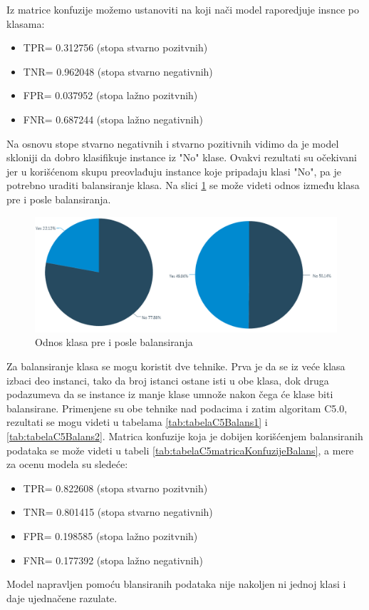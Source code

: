 \documentclass[a4paper]{article}
\begin{document}
Iz matrice konfuzije možemo ustanoviti na koji nači model raporedjuje insnce po klasama:
\begin{itemize}
    \item TPR= 0.312756 (stopa stvarno pozitvnih)
    \item TNR= 0.962048 (stopa stvarno negativnih)
    \item FPR= 0.037952 (stopa lažno pozitvnih)
    \item FNR= 0.687244 (stopa lažno negativnih)
\end{itemize}

Na osnovu stope stvarno negativnih i stvarno pozitivnih vidimo da je model skloniji da dobro klasifikuje instance iz "No" klase. Ovakvi rezultati su očekivani jer u korišćenom skupu preovlađuju instance koje pripadaju klasi "No", pa je potrebno uraditi balansiranje klasa. Na slici \ref{fig:balanca} se može videti odnos između klasa pre i posle balansiranja.


\begin{figure}[h!]
\begin{center}
    \includegraphics[scale=0.15]{balance.png}
    \caption{Odnos klasa pre i posle balansiranja}
    \label{fig:balanca}
\end{center}
\end{figure}


Za balansiranje klasa se mogu koristit dve tehnike. Prva je da se iz veće klasa izbaci deo instanci, tako da broj istanci ostane isti u obe klasa, dok druga podazumeva da se instance iz manje klase umnože nakon čega će klase biti balansirane.
Primenjene su obe tehnike nad podacima i zatim algoritam C5.0, rezultati se mogu videti u tabelama 
\ref{tab:tabelaC5Balans1} i \ref{tab:tabelaC5Balans2}. Matrica konfuzije koja je dobijen korišćenjem balansiranih podataka se može videti u tabeli \ref{tab:tabelaC5matricaKonfuzijeBalans}, a mere za ocenu modela su sledeće:

\begin{itemize}
    \item TPR= 0.822608 (stopa stvarno pozitvnih)
    \item TNR= 0.801415 (stopa stvarno negativnih)
    \item FPR= 0.198585 (stopa lažno pozitvnih)
    \item FNR= 0.177392 (stopa lažno negativnih)
\end{itemize}
Model napravljen pomoću blansiranih podataka nije nakoljen ni jednoj klasi i daje ujednačene razulate.
\end{document}
